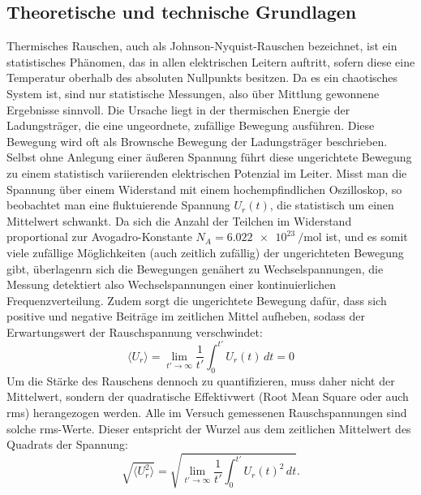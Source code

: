\newpage

\subsection[Theoretische und technische Grundlagen]{Theoretische und technische Grundlagen \protect\autocite{Skript_2.2}}

Thermisches Rauschen, auch als Johnson-Nyquist-Rauschen bezeichnet, ist ein statistisches Phänomen, das in allen elektrischen Leitern auftritt, sofern diese eine Temperatur oberhalb des absoluten Nullpunkts besitzen. Da es ein chaotisches System ist, sind nur statistische Messungen, also über Mittlung gewonnene Ergebnisse sinnvoll. Die Ursache liegt in der thermischen Energie der Ladungsträger, die eine ungeordnete, zufällige Bewegung ausführen. Diese Bewegung wird oft als Brownsche Bewegung der Ladungsträger beschrieben. Selbst ohne Anlegung einer äußeren Spannung führt diese ungerichtete Bewegung zu einem statistisch variierenden elektrischen Potenzial im Leiter. Misst man die Spannung über einem Widerstand mit einem hochempfindlichen Oszilloskop, so beobachtet man eine fluktuierende Spannung \(U_r(t)\), die statistisch um einen Mittelwert schwankt. Da sich die Anzahl der Teilchen im Widerstand proportional zur Avogadro-Konstante \(N_A=\qty{6.022e23}{\per\mole}\) ist, und es somit viele zufällige Möglichkeiten (auch zeitlich zufällig) der ungerichteten Bewegung gibt, überlagenrn sich die Bewegungen genähert zu Wechselspannungen, die Messung detektiert also Wechselspannungen einer kontinuierlichen Frequenzverteilung.
Zudem sorgt die ungerichtete Bewegung dafür, dass sich positive und negative Beiträge im zeitlichen Mittel aufheben, sodass der Erwartungswert der Rauschspannung verschwindet:
\begin{equation} \label{eq:mean_zero}
    \langle U_r \rangle = \lim_{t' \to \infty} \frac{1}{t'} \int_0^{t'} U_r(t) \, dt = 0
\end{equation}
Um die Stärke des Rauschens dennoch zu quantifizieren, muss daher nicht der Mittelwert, sondern der quadratische Effektivwert (Root Mean Square oder auch rms) herangezogen werden. Alle im Versuch gemessenen Rauschspannungen sind solche rms-Werte. Dieser entspricht der Wurzel aus dem zeitlichen Mittelwert des Quadrats der Spannung:
\begin{equation} \label{eq:rms_def} 
    \sqrt{\langle U_r^2 \rangle} = \sqrt{\lim_{t' \to \infty} \frac{1}{t'} \int_0^{t'} U_r(t)^2 \, dt} .
\end{equation}

